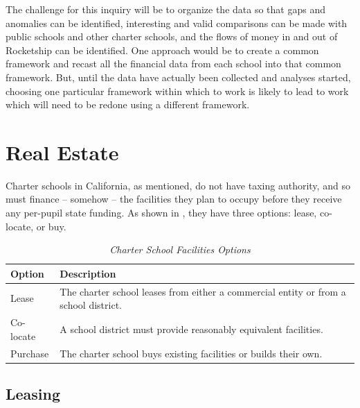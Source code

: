 The challenge for this inquiry will be to organize the data so that gaps and anomalies can be identified, interesting and valid comparisons can be made with public schools and other charter schools, and the flows of money in and out of Rocketship can be identified. One approach would be to create a common framework and recast all the financial data from each school into that common framework. But, until the data have actually been collected and analyses started, choosing one particular framework within which to work is likely to lead to work which will need to be redone using a different framework.


\section{Real Estate}\label{sec:real-estate}\indent

Charter schools in California, as mentioned, do not have taxing authority, and so must finance – somehow – the facilities they plan to occupy before they receive any per-pupil state funding. As shown in , they have three options: lease, co-locate, or buy.

\begin{table}[htb]
  \centering\small%
  \caption[Charter School Facilities Options]{\textit{Charter School Facilities Options}}\label{tab:charter-facilities-options}%
  \begin{tabular}{ll}
    \toprule%
    Option    & Description \\
    \midrule%
    Lease     & The charter school leases from either a commercial entity or from a school district. \\
    Co-locate & A school district must provide reasonably equivalent facilities. \\
    Purchase  & The charter school buys existing facilities or builds their own. \\
    \bottomrule%
  \end{tabular}
\end{table}%

\subsection{Leasing}\label{sec:leasing}\indent


